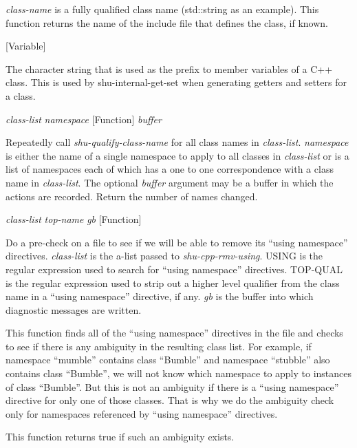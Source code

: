 \begin{doc-string}
\emph{class-name} is a fully qualified class name (std::string as an example).  This
function returns the name of the include file that defines the class, if known.
\end{doc-string}

\vspace{1em}
\noindent
{}
\usebox{\funcname}
 \hfill [Variable]

\begin{doc-string}
The character string that is used as the prefix to member variables of a C++ class.
This is used by shu-internal-get-set when generating getters and setters for a class.
\end{doc-string}

\vspace{1em}
\noindent
{}
\usebox{\funcname}\emph{class-list} \emph{namespace}
 \hfill [Function]
\hspace*{\wd\funcname}\emph{buffer}

\begin{doc-string}
Repeatedly call \emph{shu-qualify-class-name} for all class names in \emph{class-list}.
\emph{namespace} is either the name of a single namespace to apply to all classes
in \emph{class-list} or is a list of namespaces each of which has a one to one
correspondence with a class name in \emph{class-list}.  The optional \emph{buffer}
argument may be a buffer in which the actions are recorded.  Return the
number of names changed.
\end{doc-string}

\vspace{1em}
\noindent
{}
\usebox{\funcname}\emph{class-list} \emph{top-name} \emph{gb}
 \hfill [Function]

\begin{doc-string}
Do a pre-check on a file to see if we will be able to remove its ``using
namespace'' directives.  \emph{class-list} is the a-list passed to \emph{shu-cpp-rmv-using}.
USING is the regular expression used to search for ``using namespace''
directives.  TOP-QUAL is the regular expression used to strip out a higher level
qualifier from the class name in a ``using namespace'' directive, if any.  \emph{gb} is
the buffer into which diagnostic messages are written.

This function finds all of the ``using namespace'' directives in the file and
checks to see if there is any ambiguity in the resulting class list.  For
example, if namespace ``mumble'' contains class ``Bumble'' and namespace
``stubble'' also contains class ``Bumble'', we will not know which namespace to
apply to instances of class ``Bumble''.  But this is not an ambiguity if there
is a ``using namespace'' directive for only one of those classes.  That is why
we do the ambiguity check only for namespaces referenced by ``using namespace''
directives.

This function returns true if such an ambiguity exists.
\end{doc-string}

